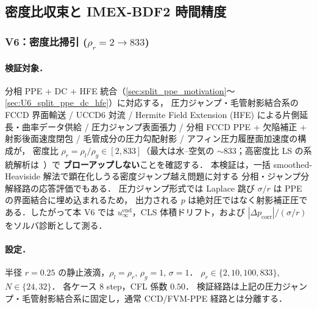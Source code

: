 %
\subsection{密度比収束と IMEX-BDF2 時間精度}
\label{sec:varrho_dc_convergence}

\subsubsection{\texorpdfstring{V6：密度比掃引 ($\rho_r = 2 \to 833$)}{V6：密度比 sweep (rho_r = 2 to 833)}}
\label{sec:density_ratio_sweep}
\label{sec:interface_crossing}

\paragraph{検証対象．}
分相 PPE + DC + HFE 統合（\autoref{sec:split_ppe_motivation}〜\autoref{sec:U6_split_ppe_dc_hfe}）に対応する，
圧力ジャンプ・毛管射影結合系の FCCD 界面輸送 / UCCD6 対流 /
Hermite Field Extension (HFE) による片側延長・曲率データ供給 / 圧力ジャンプ表面張力 /
分相 FCCD PPE + 欠陥補正 + 射影後面速度閉包 /
毛管成分の圧力勾配射影 / アフィン圧力履歴面加速度の構成が，
密度比 $\rho_r = \rho_l/\rho_g \in [2, 833]$（最大は水--空気の $\sim 833$；高密度比 LS の系統解析は~\cite{SussmanSmereka1997,Tryggvason2011}）で
\textbf{ブローアップしない}ことを確認する．
本検証は，一括 smoothed-Heaviside 解法で顕在化しうる密度ジャンプ越え問題に対する
分相・ジャンプ分解経路の応答評価でもある．
圧力ジャンプ形式では Laplace 跳び $\sigma/r$ は PPE の界面結合に埋め込まれるため，
出力される $p$ は絶対圧ではなく射影補正圧である．したがって本 V6 では
$u_\infty^{\mathrm{end}}$，CLS 体積ドリフト，および
$|\Delta p_{\mathrm{corr}}|/(\sigma/r)$ をソルバ診断として測る．

\paragraph{設定．}
半径 $r=0.25$ の静止液滴，$\rho_l=\rho_r$, $\rho_g=1$, $\sigma=1$．
$\rho_r \in \{2,10,100,833\}$, $N \in \{24,32\}$．
各ケース $8$ step，CFL 係数 $0.50$．
検証経路は上記の圧力ジャンプ・毛管射影結合系に固定し，通常 CCD/FVM-PPE 経路とは分離する．

